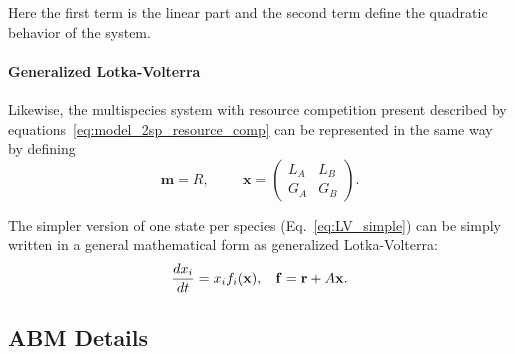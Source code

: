 \documentclass[10pt,A4paper]{article}
\numberwithin{equation}{section}
\newcommand{\mbx}{\mathbf{x}}
\newcommand{\mbm}{\mathbf{m}}
\begin{document}
Here the first term is the linear part and the second term define the quadratic behavior of the system.
%
\paragraph{Generalized Lotka-Volterra}

Likewise, the multispecies system with resource competition present described by equations~\ref{eq:model_2sp_resource_comp} can be represented in the same way by defining
\begin{equation}
    \mbm = R, \hspace{1cm}
    \mbx = \begin{pmatrix}
        L_A & L_B \\
        G_A & G_B 
    \end{pmatrix}.
\label{eq:gLV_x_m}
\end{equation}

The simpler version of one state per species (Eq.~\ref{eq:LV_simple}) can be simply written in a general mathematical form as generalized Lotka-Volterra:
\begin{equation}
    \frac{d x_i}{d t} = x_i f_i (\mbx), \hspace{3mm} \mathbf{f} = \mathbf{r} + A \mbx.
\label{eq:gLV}
\end{equation}


%

\subsection{ABM Details} \label{ssec:supplement2}
\end{document}
